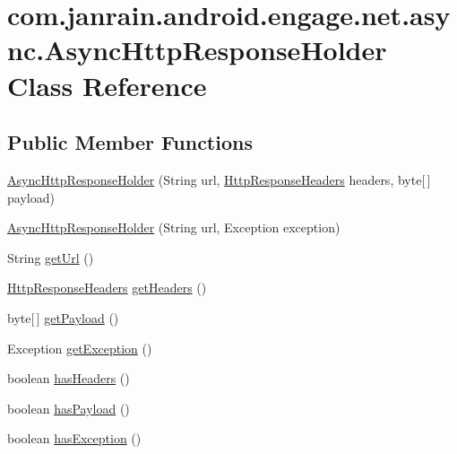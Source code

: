 \hypertarget{classcom_1_1janrain_1_1android_1_1engage_1_1net_1_1async_1_1_async_http_response_holder}{
\section{com.janrain.android.engage.net.async.AsyncHttpResponseHolder Class Reference}
\label{classcom_1_1janrain_1_1android_1_1engage_1_1net_1_1async_1_1_async_http_response_holder}
}
\subsection*{Public Member Functions}
\begin{DoxyCompactItemize}
\item 
\hyperlink{classcom_1_1janrain_1_1android_1_1engage_1_1net_1_1async_1_1_async_http_response_holder_a0931021db146aabb81dafc5b7a76cc5c}{AsyncHttpResponseHolder} (String url, \hyperlink{classcom_1_1janrain_1_1android_1_1engage_1_1net_1_1async_1_1_http_response_headers}{HttpResponseHeaders} headers, byte\mbox{[}$\,$\mbox{]} payload)
\item 
\hyperlink{classcom_1_1janrain_1_1android_1_1engage_1_1net_1_1async_1_1_async_http_response_holder_a4d96b1b67c0e3fdb50eaad9217d18130}{AsyncHttpResponseHolder} (String url, Exception exception)
\item 
String \hyperlink{classcom_1_1janrain_1_1android_1_1engage_1_1net_1_1async_1_1_async_http_response_holder_a4959dc20aff7f8e8da4c5a1b6eb2ca93}{getUrl} ()
\item 
\hyperlink{classcom_1_1janrain_1_1android_1_1engage_1_1net_1_1async_1_1_http_response_headers}{HttpResponseHeaders} \hyperlink{classcom_1_1janrain_1_1android_1_1engage_1_1net_1_1async_1_1_async_http_response_holder_a9c1633953243a4f9dbc5d6910f65f40a}{getHeaders} ()
\item 
byte\mbox{[}$\,$\mbox{]} \hyperlink{classcom_1_1janrain_1_1android_1_1engage_1_1net_1_1async_1_1_async_http_response_holder_ad067622c818b2a7e9dd38b5dffa5ade2}{getPayload} ()
\item 
Exception \hyperlink{classcom_1_1janrain_1_1android_1_1engage_1_1net_1_1async_1_1_async_http_response_holder_a76640fdc8d7b4020a9848dc7fe824acd}{getException} ()
\item 
boolean \hyperlink{classcom_1_1janrain_1_1android_1_1engage_1_1net_1_1async_1_1_async_http_response_holder_a3a0f56f785a88128a1373ba3b7a8b2a7}{hasHeaders} ()
\item 
boolean \hyperlink{classcom_1_1janrain_1_1android_1_1engage_1_1net_1_1async_1_1_async_http_response_holder_a675953c34ad6ac967d58e7b7b16fdcd7}{hasPayload} ()
\item 
boolean \hyperlink{classcom_1_1janrain_1_1android_1_1engage_1_1net_1_1async_1_1_async_http_response_holder_afa0f93b10cdbdb2dedbb006c9544cd44}{hasException} ()
\end{DoxyCompactItemize}


